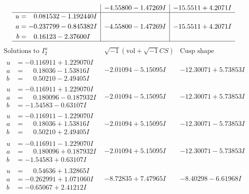 \documentclass[1p]{elsarticle_modified}
\theoremstyle{definition}
\newcommand{\I}{\sqrt{-1}}
\begin{document}
$$\begin{array}{c|c|c}
 & -4.55800 - 1.47269 I & -15.5511 + 4.2071 I \\ \hline\begin{aligned}
u &= \phantom{-}0.081532 - 1.192440 I \\
a &= -0.237799 - 0.845382 I \\
b &= \phantom{-}0.16123 - 2.37600 I\end{aligned}
 & -4.55800 - 1.47269 I & -15.5511 + 4.2071 I\\
 \hline 
 \end{array}$$\newpage$$\begin{array}{c|c|c}  
\text{Solutions to }I^u_{2}& \I (\text{vol} + \sqrt{-1}CS) & \text{Cusp shape}\\
 \hline 
\begin{aligned}
u &= -0.116911 + 1.229070 I \\
a &= \phantom{-}0.18036 - 1.53816 I \\
b &= \phantom{-}0.50210 - 2.49405 I\end{aligned}
 & -2.01094 - 5.15095 I & -12.30071 + 5.73853 I \\ \hline\begin{aligned}
u &= -0.116911 + 1.229070 I \\
a &= \phantom{-}0.180096 - 0.187932 I \\
b &= -1.54583 - 0.63107 I\end{aligned}
 & -2.01094 - 5.15095 I & -12.30071 + 5.73853 I \\ \hline\begin{aligned}
u &= -0.116911 - 1.229070 I \\
a &= \phantom{-}0.18036 + 1.53816 I \\
b &= \phantom{-}0.50210 + 2.49405 I\end{aligned}
 & -2.01094 + 5.15095 I & -12.30071 - 5.73853 I \\ \hline\begin{aligned}
u &= -0.116911 - 1.229070 I \\
a &= \phantom{-}0.180096 + 0.187932 I \\
b &= -1.54583 + 0.63107 I\end{aligned}
 & -2.01094 + 5.15095 I & -12.30071 - 5.73853 I \\ \hline\begin{aligned}
u &= \phantom{-}0.54636 + 1.32865 I \\
a &= -0.262991 + 1.071060 I \\
b &= -0.65067 + 2.41212 I\end{aligned}
 & -8.72835 + 7.47965 I & -8.40298 - 6.61968 I \\ \hline\begin{aligned}

\end{aligned}
\end{array}$$
\end{document}

